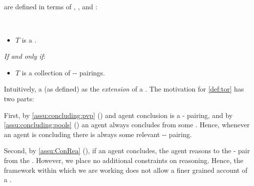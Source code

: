 \subsection{}
\label{cha:typical:tCDef:ToRdef}

\begin{note}
   are defined in terms of , , and :

  \begin{definition}[\torN{2}]
    \label{def:tor}
    \mbox{ }
    \vspace{-\baselineskip}
    \begin{itemize}
    \item
      \(T\) is a \torN{}.
    \end{itemize}

    \emph{If and only if}:

    \begin{itemize}
    \item
      \(T\) is a collection of -- pairings.
    \end{itemize}
    \vspace{-\baselineskip}
  \end{definition}

  \noindent%
  Intuitively, a \torN{} (as defined) as the \emph{extension} of a \torN{}.
  The motivation for \autoref{def:tor} has two parts:

  First, by \autoref{assu:concluding:pvp} () and agent conclusion is a - pairing, and by \autoref{assu:concluding:pools} () an agent always concludes from some \pool{}.
  Hence, whenever an agent is concluding there is always some relevant -- pairing.

  Second, by \autoref{assu:ConRea} (), if an agent concludes, the agent reasons to the - pair from the .
  However, we place no additional constraints on reasoning.
  Hence, the framework within which we are working does not allow a finer grained account of a \torN{}.
\end{note}

